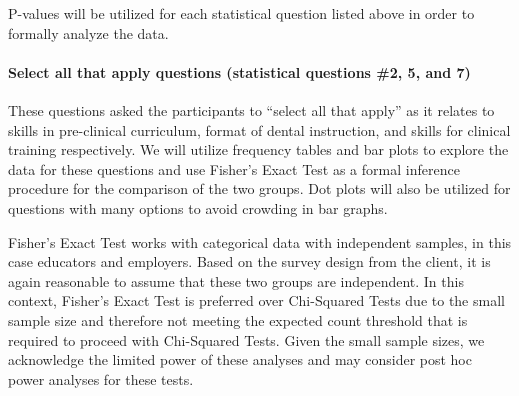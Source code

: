 \documentclass[
  11pt,
  letterpaper,
  DIV=11,
  numbers=noendperiod]{scrartcl}
\let\oldparagraph\paragraph
\renewcommand{\paragraph}[1]{\oldparagraph{#1}\mbox{}}
\numberwithin{figure}{section}
\begin{document}
P-values will be utilized for each statistical question listed above in
order to formally analyze the data.

\hypertarget{select-all-that-apply-questions-statistical-questions-2-5-and-7}{%
\paragraph{Select all that apply questions (statistical questions \#2,
5, and
7)}\label{select-all-that-apply-questions-statistical-questions-2-5-and-7}}

These questions asked the participants to ``select all that apply'' as
it relates to skills in pre-clinical curriculum, format of dental
instruction, and skills for clinical training respectively. We will
utilize frequency tables and bar plots to explore the data for these
questions and use Fisher's Exact Test as a formal inference procedure
for the comparison of the two groups. Dot plots will also be utilized
for questions with many options to avoid crowding in bar graphs.

Fisher's Exact Test works with categorical data with independent
samples, in this case educators and employers. Based on the survey
design from the client, it is again reasonable to assume that these two
groups are independent. In this context, Fisher's Exact Test is
preferred over Chi-Squared Tests due to the small sample size and
therefore not meeting the expected count threshold that is required to
proceed with Chi-Squared Tests. Given the small sample sizes, we
acknowledge the limited power of these analyses and may consider post
hoc power analyses for these tests.
\end{document}
